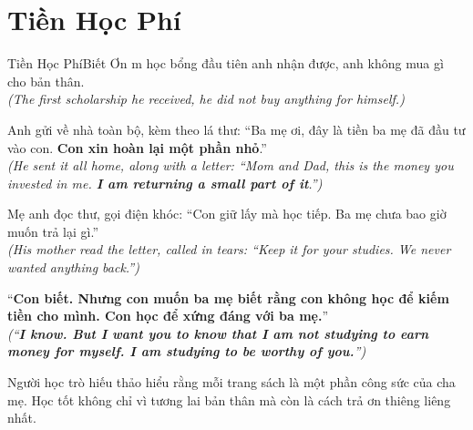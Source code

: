 \section{Tiền Học Phí}
\begin{truyen}{Tiền Học Phí}{Biết Ơn}
m học bổng đầu tiên anh nhận được, anh không mua gì cho bản thân.\\
\textit{(The first scholarship he received, he did not buy anything for himself.)}

Anh gửi về nhà toàn bộ, kèm theo lá thư: ``Ba mẹ ơi, đây là tiền ba mẹ đã đầu tư vào con. \textbf{Con xin hoàn lại một phần nhỏ}.''\\
\textit{(He sent it all home, along with a letter: ``Mom and Dad, this is the money you invested in me. \textbf{I am returning a small part of it}.'')}

Mẹ anh đọc thư, gọi điện khóc: ``Con giữ lấy mà học tiếp. Ba mẹ chưa bao giờ muốn trả lại gì.''\\
\textit{(His mother read the letter, called in tears: ``Keep it for your studies. We never wanted anything back.'')}

``\textbf{Con biết. Nhưng con muốn ba mẹ biết rằng con không học để kiếm tiền cho mình. Con học để xứng đáng với ba mẹ.}''\\
\textit{(``\textbf{I know. But I want you to know that I am not studying to earn money for myself. I am studying to be worthy of you.}'')}
\end{truyen}
\begin{baihoc}
  Người học trò hiếu thảo hiểu rằng mỗi trang sách là một phần công sức của cha mẹ. Học tốt không chỉ vì tương lai bản thân mà còn là cách trả ơn thiêng liêng nhất.
\end{baihoc}

